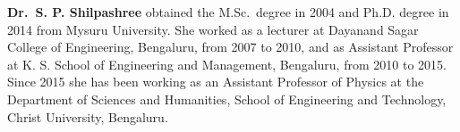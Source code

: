 \noindent
{\biofntsize\textbf{Dr.\ S. P. Shilpashree} obtained the M.Sc.\ degree in 2004 and Ph.D. degree in 2014 from Mysuru University. She worked as a lecturer at Dayanand Sagar College of Engineering, Bengaluru, from 2007 to 2010, and as Assistant Professor at K. S. School of Engineering and Management, Bengaluru, from 2010 to 2015. Since 2015 she has been working as an Assistant Professor of Physics at the Department of Sciences and Humanities, School of Engineering and Technology, Christ University, Bengaluru.}
